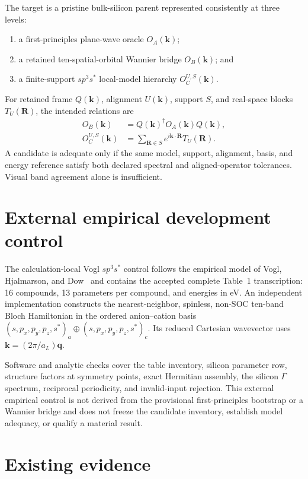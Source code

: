 \documentclass[11pt]{article}
\begin{document}
The target is a pristine bulk-silicon parent represented consistently at three levels:
\begin{enumerate}
  \item a first-principles plane-wave oracle $O_A(\mathbf{k})$;
  \item a retained ten-spatial-orbital Wannier bridge $O_B(\mathbf{k})$; and
  \item a finite-support $sp^3s^*$ local-model hierarchy
    $O_C^{U,S}(\mathbf{k})$.
\end{enumerate}

For retained frame $Q(\mathbf{k})$, alignment $U(\mathbf{k})$, support $S$, and
real-space blocks $T_U(\mathbf{R})$, the intended relations are
\begin{align}
  O_B(\mathbf{k})
    &= Q(\mathbf{k})^\dagger O_A(\mathbf{k})Q(\mathbf{k}), \\
  O_C^{U,S}(\mathbf{k})
    &= \sum_{\mathbf{R}\in S}
       e^{i\mathbf{k}\cdot\mathbf{R}}T_U(\mathbf{R}).
\end{align}
A candidate is adequate only if the same model, support, alignment, basis, and energy
reference satisfy both declared spectral and aligned-operator tolerances.  Visual band
agreement alone is insufficient.

\section{External empirical development control}

The calculation-local Vogl $sp^3s^*$ control follows the empirical model of
Vogl, Hjalmarson, and Dow~\cite{Vogl1983} and contains the accepted complete Table~1
transcription: 16 compounds, 13 parameters per compound, and energies in eV.  An
independent implementation constructs the nearest-neighbor, spinless, non-SOC ten-band
Bloch Hamiltonian in the ordered anion--cation basis
$(s,p_x,p_y,p_z,s^*)_a\oplus(s,p_x,p_y,p_z,s^*)_c$.  Its reduced Cartesian wavevector
uses $\mathbf{k}=(2\pi/a_L)\mathbf{q}$.

Software and analytic checks cover the table inventory, silicon parameter row,
structure factors at symmetry points, exact Hermitian assembly, the silicon $\Gamma$
spectrum, reciprocal periodicity, and invalid-input rejection.  This external empirical
control is not derived from the provisional first-principles bootstrap or a Wannier
bridge and does not freeze the candidate inventory, establish model adequacy, or qualify
a material result.

\section{Existing evidence}
\end{document}
